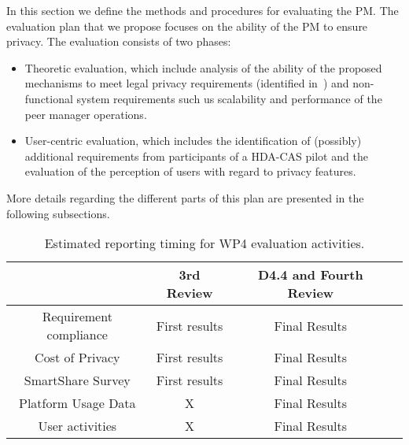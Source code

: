 
  
  


In this section we define the methods and procedures for evaluating the PM. %
The evaluation plan that we propose focuses on the ability of the PM to ensure privacy. The evaluation consists of two phases:
\begin{itemize}
\item Theoretic evaluation, which include analysis of the ability of the proposed mechanisms to meet legal privacy requirements (identified in~\cite{D4.1}) and non-functional system requirements such us scalability and performance of the peer manager operations.
\item User-centric evaluation, which includes the identification of (possibly) additional requirements from participants of a HDA-CAS pilot and the evaluation of the perception of users with regard to privacy features. %
\end{itemize}
More details regarding the different parts of this plan are presented in the following subsections.

\begin{table}[!ht]
\begin{center}
\begin{tabular}{| c | c | c | c |}
  \hline                       
   & 3rd Review & D4.4 and Fourth Review\\  
  \hline                       
  Requirement compliance & First results & Final Results \\
  \hline          
  Cost of Privacy & First results & Final Results \\
  \hline
  SmartShare Survey & First results & Final Results \\
  \hline
  Platform Usage Data & X & Final Results \\
  \hline  
  User activities & X & Final Results\\
  \hline
\end{tabular}
\end{center}
\caption{Estimated reporting timing for WP4 evaluation activities.\label{t-validation-delivery}}
\end{table}


